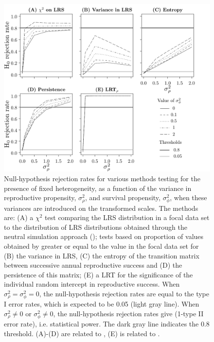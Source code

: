 \begin{figure}[H]
	\includegraphics[width=\textwidth]{FiguresDynHet/Figure2}
		\caption{ \footnotesize Null-hypothesis rejection rates for various methods testing for the presence of fixed heterogeneity, as a function of the variance in reproductive propensity, $\sigma_{\rho}^2$, and survival propensity, $\sigma_{\phi}^2$, when these variances are introduced on the transformed scales. The methods are: (A) a $\chi^2$ test comparing the LRS distribution in a focal data set to the distribution of LRS distributions obtained through the neutral simulation approach (\NSM); tests based on proportion of values obtained by \NSM greater or equal to the value in the focal data set for (B) the variance in LRS, (C) the entropy of the transition matrix between successive annual reproductive success and (D) the persistence of this matrix; (E) a LRT for the significance of the individual random intercept in reproductive success. When $\sigma_{\rho}^2 = \sigma_{\phi}^2 = 0$, the null-hypothesis rejection rates are equal to the type I error rates, which is expected to be 0.05 (light gray line). When $\sigma_{\rho}^2 \neq 0$ or $\sigma_{\phi}^2 \neq 0$, the null-hypothesis rejection rates give (1-type II error rate), i.e. statistical power. The dark gray line indicates the 0.8 threshold. (A)-(D) are related to \NSM, (E) is related to \MM.}
	\label{figure:VarIn}
\end{figure} 	

